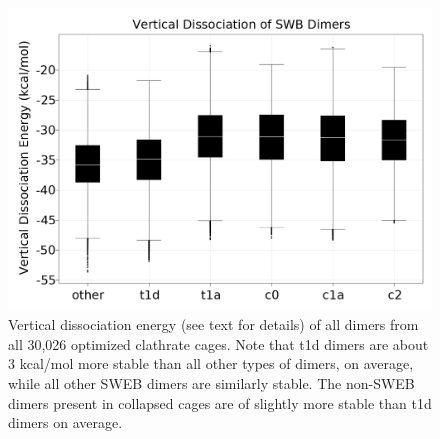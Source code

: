 \begin{figure}[t]
\uwsinglespace
\begin{center}
\includegraphics[width=.9\textwidth]{Figures/Chapter_6/w20_clathrate_vertical_dissociation_dimers.png}
\end{center}
\begin{spacing}{1.0}
\caption[Vertical dissociation energy (see text for details) of all dimers from all 30,026 optimized  clathrate cages. Note that t1d dimers are about 3 kcal/mol more stable than all other types of dimers, on average, while all other SWEB dimers are similarly stable. The non-SWEB dimers present in collapsed cages are of slightly more stable than t1d dimers on average.]{Vertical dissociation energy (see text for details) of all dimers from all 30,026 optimized  clathrate cages. Note that t1d dimers are about 3 kcal/mol more stable than all other types of dimers, on average, while all other SWEB dimers are similarly stable. The non-SWEB dimers present in collapsed cages are of slightly more stable than t1d dimers on average.}\label{fig:MBE_III_F4}
\end{spacing}
\end{figure}